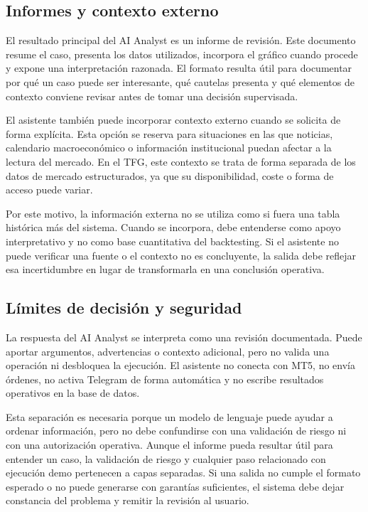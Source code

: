 \subsection{Informes y contexto externo}
\label{subsec:ai-analyst-informes-contexto}

El resultado principal del AI Analyst es un informe de revisi\'on. Este documento
resume el caso, presenta los datos utilizados, incorpora el gr\'afico cuando
procede y expone una interpretaci\'on razonada. El formato resulta \'util para
documentar por qu\'e un caso puede ser interesante, qu\'e cautelas presenta y qu\'e
elementos de contexto conviene revisar antes de tomar una decisi\'on supervisada.

El asistente tambi\'en puede incorporar contexto externo cuando se solicita de
forma expl\'icita. Esta opci\'on se reserva para situaciones en las que noticias,
calendario macroecon\'omico o informaci\'on institucional puedan afectar a la
lectura del mercado. En el TFG, este contexto se trata de forma separada de los
datos de mercado estructurados, ya que su disponibilidad, coste o forma de
acceso puede variar.

Por este motivo, la informaci\'on externa no se utiliza como si fuera una tabla
hist\'orica m\'as del sistema. Cuando se incorpora, debe entenderse como apoyo
interpretativo y no como base cuantitativa del backtesting. Si el asistente no
puede verificar una fuente o el contexto no es concluyente, la salida debe
reflejar esa incertidumbre en lugar de transformarla en una conclusi\'on
operativa.

\subsection{L\'imites de decisi\'on y seguridad}
\label{subsec:ai-analyst-limites-decision-seguridad}

La respuesta del AI Analyst se interpreta como una revisi\'on documentada. Puede
aportar argumentos, advertencias o contexto adicional, pero no valida una
operaci\'on ni desbloquea la ejecuci\'on. El asistente no conecta con MT5, no env\'ia
\'ordenes, no activa Telegram de forma autom\'atica y no escribe resultados
operativos en la base de datos.

Esta separaci\'on es necesaria porque un modelo de lenguaje puede ayudar a ordenar
informaci\'on, pero no debe confundirse con una validaci\'on de riesgo ni con una
autorizaci\'on operativa. Aunque el informe pueda resultar \'util para entender un
caso, la validaci\'on de riesgo y cualquier paso relacionado con ejecuci\'on demo
pertenecen a capas separadas. Si una salida no cumple el formato esperado o no
puede generarse con garant\'ias suficientes, el sistema debe dejar constancia del
problema y remitir la revisi\'on al usuario.

